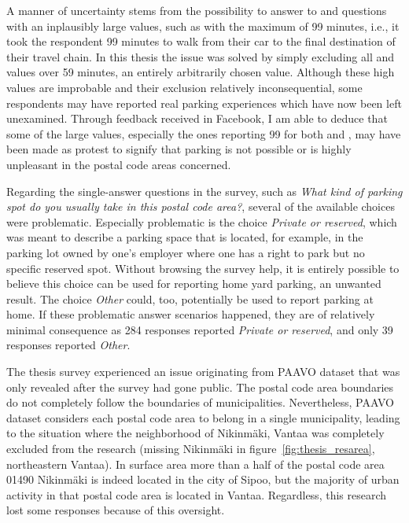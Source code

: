 A manner of uncertainty stems from the possibility to answer to  and  questions with an inplausibly large values, such as with the maximum of 99 minutes, i.e., it took the respondent 99 minutes to walk from their car to the final destination of their travel chain. In this thesis the issue was solved by simply excluding all  and  values over 59 minutes, an entirely arbitrarily chosen value. Although these high values are improbable and their exclusion relatively inconsequential, some respondents may have reported real parking experiences which have now been left unexamined. Through feedback received in Facebook, I am able to deduce that some of the large values, especially the ones reporting 99 for both  and , may have been made as protest to signify that parking is not possible or is highly unpleasant in the postal code areas concerned.

Regarding the single-answer questions in the survey, such as \textit{What kind of parking spot do you usually take in this postal code area?}, several of the available choices were problematic. Especially problematic is the choice \textit{Private or reserved}, which was meant to describe a parking space that is located, for example, in the parking lot owned by one's employer where one has a right to park but no specific reserved spot. Without browsing the survey help, it is entirely possible to believe this choice can be used for reporting home yard parking, an unwanted result. The choice \textit{Other} could, too, potentially be used to report parking at home. If these problematic  answer scenarios happened, they are of relatively minimal consequence as 284 responses reported \textit{Private or reserved}, and only 39 responses reported \textit{Other}.

The thesis survey experienced an issue originating from PAAVO dataset that was only revealed after the survey had gone public. The postal code area boundaries do not completely follow the boundaries of municipalities. Nevertheless, PAAVO dataset considers each postal code area to belong in a single municipality, leading to the situation where the neighborhood of Nikinmäki, Vantaa was completely excluded from the research (missing Nikinmäki in figure~\ref{fig:thesis_resarea}, northeastern Vantaa). In surface area more than a half of the postal code area 01490 Nikinmäki is indeed located in the city of Sipoo, but the majority of urban activity in that postal code area is located in Vantaa. Regardless, this research lost some responses because of this oversight.

